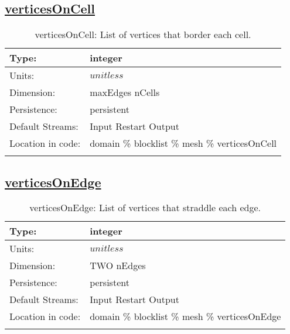 \subsection[verticesOnCell]{\hyperref[sec:var_tab_mesh]{verticesOnCell}}
\label{subsec:var_sec_mesh_verticesOnCell}
\begin{center}
\begin{longtable}{| p{2.0in} | p{4.0in} |}
        \hline 
        Type: & integer \\
        \hline 
        Units: & $unitless$ \\
        \hline 
        Dimension: & maxEdges nCells \\
        \hline 
        Persistence: & persistent \\
        \hline 
		 Default Streams: & Input Restart Output  \\
        \hline 
		 Location in code: & domain \% blocklist \% mesh \% verticesOnCell \\
		 \hline 
    \caption{verticesOnCell: List of vertices that border each cell.}
\end{longtable}
\end{center}
\subsection[verticesOnEdge]{\hyperref[sec:var_tab_mesh]{verticesOnEdge}}
\label{subsec:var_sec_mesh_verticesOnEdge}
\begin{center}
\begin{longtable}{| p{2.0in} | p{4.0in} |}
        \hline 
        Type: & integer \\
        \hline 
        Units: & $unitless$ \\
        \hline 
        Dimension: & TWO nEdges \\
        \hline 
        Persistence: & persistent \\
        \hline 
		 Default Streams: & Input Restart Output  \\
        \hline 
		 Location in code: & domain \% blocklist \% mesh \% verticesOnEdge \\
		 \hline 
    \caption{verticesOnEdge: List of vertices that straddle each edge.}
\end{longtable}
\end{center}
